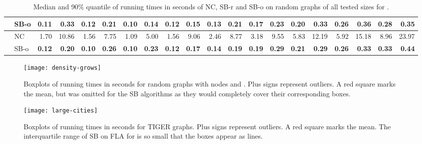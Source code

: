 \documentclass[runningheads,a4paper]{llncs}
\begin{document}
\begin{sidewaystable}
\begin{tabularx}{1\textwidth}{p{0.8cm}p{0.8cm}|RR|RR|RR|RR|RR|RR|RR|RR|RR}
 & \centering SB-o  & \textbf{0.11} & \textbf{0.33} & \textbf{0.12} & \textbf{0.21} & \textbf{0.10} & \textbf{0.14} & \textbf{0.12} & \textbf{0.15} & \textbf{0.13} & \textbf{0.21} & \textbf{0.17} & \textbf{0.23} & \textbf{0.20} & \textbf{0.33} & \textbf{0.26} & \textbf{0.36} & \textbf{0.28} & \textbf{0.35} \\
\hline
\centering{} & \centering NC & 1.70 & 10.86 & 1.56 & 7.75 & 1.09 & 5.00 & 1.56 & 9.06 & 2.46 & 8.77 & 3.18 & 9.55 & 5.83 & 12.19 & 5.92 & 15.18 & 8.96 & 23.97 \\
 & \centering SB-o  & \textbf{0.12} & \textbf{0.20} & \textbf{0.10} & \textbf{0.26} & \textbf{0.10} & \textbf{0.23} & \textbf{0.12} & \textbf{0.17} & \textbf{0.14} & \textbf{0.19} & \textbf{0.19} & \textbf{0.29} & \textbf{0.21} & \textbf{0.29} & \textbf{0.26} & \textbf{0.33} & \textbf{0.33} & \textbf{0.44} \\
    \hline
\end{tabularx}
\caption{Median and 90\% quantile  of running times in seconds of NC, SB-r and SB-o on random graphs of all tested sizes for .}
\end{sidewaystable}



\begin{sidewaysfigure}[tb]
\centering
\texttt{[image: density-grows]}
\caption{Boxplots of running times in seconds for random graphs with  nodes and . Plus signs represent outliers. A red square marks the mean, but was omitted for the SB algorithms as they would completely cover their corresponding boxes.}
\label{fig:sprand-boxplot}
\end{sidewaysfigure}

\begin{sidewaysfigure}[tb]
\centering
\texttt{[image: large-cities]}
\caption{Boxplots of running times in seconds for TIGER graphs. Plus signs represent outliers. A red square marks the mean. The interquartile range of SB on FLA for  is so small that the boxes appear as lines.}
\label{fig:large-cities}
\end{sidewaysfigure}
\end{document}
